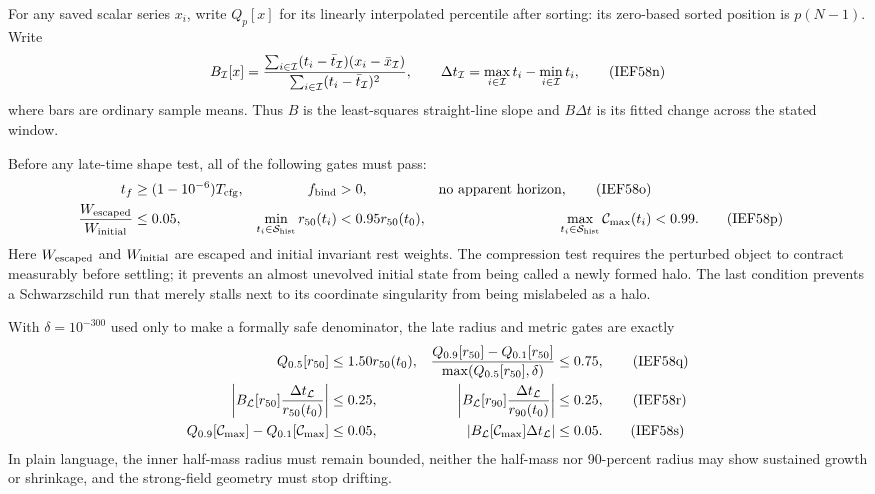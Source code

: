 For any saved scalar series \(x_i\), write \(Q_p[x]\) for its linearly
interpolated percentile after sorting: its zero-based sorted position is
\(p(N-1)\).  Write
\[
 B_{\cal I}[x]
 =\frac{\sum_{i\in{\cal I}}(t_i-\bar t_{\cal I})
                             (x_i-\bar x_{\cal I})}
        {\sum_{i\in{\cal I}}(t_i-\bar t_{\cal I})^2},
 \qquad
 \Delta t_{\cal I}=\max_{i\in{\cal I}}t_i-
                    \min_{i\in{\cal I}}t_i,           \tag{IEF58n}
\]
where bars are ordinary sample means.  Thus \(B\) is the least-squares
straight-line slope and \(B\Delta t\) is its fitted change across the stated
window.

Before any late-time shape test, all of the following gates must pass:
\begin{align}
 t_f&\ge(1-10^{-6})T_{\rm cfg},&
 f_{\rm bind}&>0,&
 \hbox{no apparent horizon},                           \tag{IEF58o}\\
 \frac{W_{\rm escaped}}{W_{\rm initial}}&\le0.05,&
 \min_{t_i\in{\cal S}_{\rm hist}}r_{50}(t_i)&<0.95r_{50}(t_0),&
 \max_{t_i\in{\cal S}_{\rm hist}}{\cal C}_{\max}(t_i)&<0.99. \tag{IEF58p}
\end{align}
Here \(W_{\rm escaped}\) and \(W_{\rm initial}\) are escaped and initial
invariant rest weights.  The compression test requires the perturbed object
to contract measurably before settling; it prevents an almost unevolved
initial state from being called a newly formed halo.  The last condition
prevents a Schwarzschild run that merely stalls next to its coordinate
singularity from being mislabeled as a halo.

With \(\delta=10^{-300}\) used only to make a formally safe denominator, the
late radius and metric gates are exactly
\begin{align}
 Q_{0.5}[r_{50}]&\le1.50r_{50}(t_0),&
 \frac{Q_{0.9}[r_{50}]-Q_{0.1}[r_{50}]}
      {\max(Q_{0.5}[r_{50}],\delta)}&\le0.75,          \tag{IEF58q}\\
 \left|B_{\cal L}[r_{50}]\frac{\Delta t_{\cal L}}
                                  {r_{50}(t_0)}\right|&\le0.25,&
 \left|B_{\cal L}[r_{90}]\frac{\Delta t_{\cal L}}
                                  {r_{90}(t_0)}\right|&\le0.25,\tag{IEF58r}\\
 Q_{0.9}[{\cal C}_{\max}]-Q_{0.1}[{\cal C}_{\max}]&\le0.05,&
 \left|B_{\cal L}[{\cal C}_{\max}]\Delta t_{\cal L}\right|&\le0.05.
                                                               \tag{IEF58s}
\end{align}
In plain language, the inner half-mass radius must remain bounded, neither
the half-mass nor 90-percent radius may show sustained growth or shrinkage,
and the strong-field geometry must stop drifting.


